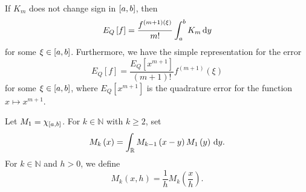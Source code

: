 \begin{frame}
    \begin{theorem}
        If $K_{m}$ does not change sign in $\left[a,b\right]$, then
        \begin{equation*}
            E_{Q}\left[f\right]=
            \dfrac{f^{\left(m+1\right)\left(\xi\right)}}{m!}
            \int_{a}^{b}K_{m}
            \dl y
        \end{equation*}
        for some $\xi\in\left[a,b\right]$.
        Furthermore, we have the simple representation for the error
        \begin{equation*}
            E_{Q}\left[f\right]=
            \dfrac{E_{Q}\left[x^{m+1}\right]}{\left(m+1\right)!}
            f^{\left(m+1\right)}\left(\xi\right)
        \end{equation*}
        for some $\xi\in\left[a,b\right]$, where $E_{Q}\left[x^{m+1}\right]$
        is the quadrature error for the function $x\mapsto x^{m+1}$.
    \end{theorem}

    \begin{definition}
        Let $M_{1}=\chi_{\left[a,b\right]}$.
        For $k\in\mathbb{N}$ with $k\geq 2$, set
        \begin{equation*}
            M_{k}\left(x\right)=
            \int_{\mathbb{R}}
            M_{k-1}\left(x-y\right)M_{1}\left(y\right)
            \dl y.
        \end{equation*}
        For $k\in\mathbb{N}$ and $h>0$, we define
        \begin{equation*}
            M_{k}\left(x,h\right)=
            \dfrac{1}{h}
            M_{k}
            \left(\dfrac{x}{h}\right).
        \end{equation*}
    \end{definition}
\end{frame}


